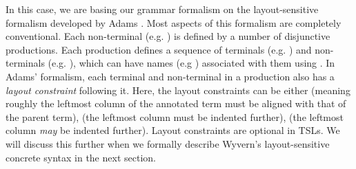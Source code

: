 In this case, we are basing our grammar formalism on the layout-sensitive formalism developed by Adams \cite{Adams:2013:PPI:2429069.2429129}. Most aspects of this formalism are completely conventional. 
Each non-terminal (e.g. ) is defined by a number of disjunctive productions. Each production defines a sequence of terminals (e.g. ) and non-terminals (e.g. ), which can have names (e.g ) associated with them using \li{::}. In Adams' formalism, each terminal and non-terminal in a production also has a \emph{layout constraint} following it. Here, the layout constraints can be either \li{=} (meaning roughly the leftmost column of the annotated term must be aligned with that of the parent term), \li{>} (the leftmost column must be indented further), \li{>=} (the leftmost column \emph{may} be indented further). Layout constraints are optional in TSLs. We will discuss this further when we formally describe Wyvern's layout-sensitive concrete syntax in the next section.

